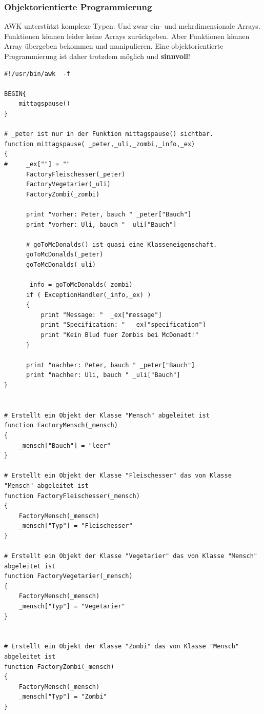 \documentclass[10pt,a4paper]{article}
\begin{document}
\bigskip 

\subsubsection{Objektorientierte Programmierung}

AWK unterstützt komplexe Typen. Und zwar ein- und mehrdimensionale Arrays.
Funktionen können leider keine Arrays zurückgeben. Aber Funktionen können Array
übergeben bekommen und manipulieren. Eine objektorientierte
Programmierung ist daher trotzdem möglich und \textbf{sinnvoll}!

\bigskip

\begin{lstlisting}
#!/usr/bin/awk  -f

BEGIN{
    mittagspause()
}

# _peter ist nur in der Funktion mittagspause() sichtbar.
function mittagspause( _peter,_uli,_zombi,_info,_ex)
{
#     _ex[""] = ""
      FactoryFleischesser(_peter)
      FactoryVegetarier(_uli)
      FactoryZombi(_zombi)

      print "vorher: Peter, bauch " _peter["Bauch"]
      print "vorher: Uli, bauch " _uli["Bauch"]

      # goToMcDonalds() ist quasi eine Klasseneigenschaft.
      goToMcDonalds(_peter)
      goToMcDonalds(_uli)

      _info = goToMcDonalds(_zombi)
      if ( ExceptionHandler(_info,_ex) )
      {
          print "Message: "  _ex["message"]
          print "Specification: "  _ex["specification"]
          print "Kein Blud fuer Zombis bei McDonadt!"
      }

      print "nachher: Peter, bauch " _peter["Bauch"]
      print "nachher: Uli, bauch " _uli["Bauch"]
}


# Erstellt ein Objekt der Klasse "Mensch" abgeleitet ist
function FactoryMensch(_mensch)
{
    _mensch["Bauch"] = "leer"
}

# Erstellt ein Objekt der Klasse "Fleischesser" das von Klasse "Mensch" abgeleitet ist
function FactoryFleischesser(_mensch)
{
    FactoryMensch(_mensch)
    _mensch["Typ"] = "Fleischesser"
}

# Erstellt ein Objekt der Klasse "Vegetarier" das von Klasse "Mensch" abgeleitet ist
function FactoryVegetarier(_mensch)
{
    FactoryMensch(_mensch)
    _mensch["Typ"] = "Vegetarier"
}


# Erstellt ein Objekt der Klasse "Zombi" das von Klasse "Mensch" abgeleitet ist
function FactoryZombi(_mensch)
{
    FactoryMensch(_mensch)
    _mensch["Typ"] = "Zombi"
}



\end{lstlisting}
\end{document}
